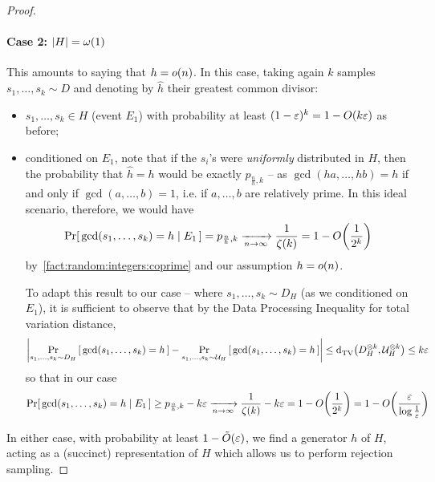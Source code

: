 \begin{proof}
\paragraph{Case 2: $\left\lvert H \right\rvert=\omega(1)$} This amounts to saying that $h=\littleO{n}$. In this case, taking again $k$ samples $s_1,\dots,s_k\sim D$ and denoting by $\hat{h}$ their greatest common divisor:
\begin{itemize}
  \item $s_1,\dots,s_k\in H$ (event $E_1$) with probability at least $(1-\eps)^k = 1 - \bigO{k\eps}$ as before;
  \item conditioned on $E_1$, note that if the $s_i$'s were \emph{uniformly} distributed in $H$, then the probability that $\hat{h}=h$ would be exactly $p_{\frac{n}{h},k}$ -- as $\gcd(ha,\dots,hb)=h$ if and only if $\gcd(a,\dots,b) =1$, i.e. if $a,\dots,b$ are relatively prime. In this ideal scenario, therefore, we would have
  \[
  \probaCond{ \gcd(s_1,\dots,s_k) = h }{E_1} = p_{\frac{n}{h},k} \xrightarrow[n\to\infty]{} \frac{1}{\zeta(k)} = 1-\bigO{\frac{1}{2^k} }
  \]
  by~\cref{fact:random:integers:coprime} and our assumption $h=\littleO{n}$.
  
  \noindent To adapt this result to our case -- where $s_1,\dots,s_k\sim D_H$ (as we conditioned on $E_1$), it is sufficient to observe that by the Data Processing Inequality for total variation distance,
  \[
  \left\lvert  \Pr_{s_1,\dots,s_k\sim D_H}\left[\,  \gcd(s_1,\dots,s_k) = h \, \right] - \Pr_{s_1,\dots,s_k\sim \mathcal{U}_H}\left[\,  \gcd(s_1,\dots,s_k) = h \, \right]  \right\rvert \leq {\operatorname{d}_{\textrm{TV}}^{}\!\left({\ensuremath{D}_H^{\otimes k}, \ensuremath{\mathcal{U}}_H^{\otimes k}}\right)} \leq k\varepsilon
  \]
  so that in our case 
  \begin{equation}
  \probaCond{ \gcd(s_1,\dots,s_k) = h }{E_1} \geq p_{\frac{n}{h},k} - k\eps \xrightarrow[n\to\infty]{} \frac{1}{\zeta(k)} - k\eps = 1-\bigO{\frac{1}{2^k}} = 1-\bigO{\frac{\eps}{\log\frac{1}{\eps}}}
  \end{equation}
\end{itemize}

In either case, with probability at least $1-\tildeO{\eps}$, we find a generator $h$ of $H$, acting as a (succinct) representation of $H$ which allows us to perform rejection sampling.
\end{proof}
 
